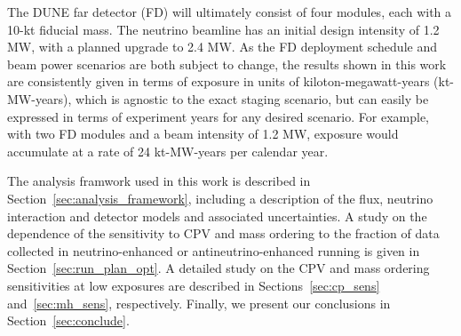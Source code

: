 The DUNE far detector (FD) will ultimately consist of four modules, each with a 10-kt fiducial mass. The neutrino beamline has an initial design intensity of 1.2 MW, with a planned upgrade to 2.4 MW. As the FD deployment schedule and beam power scenarios are both subject to change, the results shown in this work are consistently given in terms of exposure in units of kiloton-megawatt-years (kt-MW-years), which is agnostic to the exact staging scenario, but can easily be expressed in terms of experiment years for any desired scenario. For example, with two FD modules and a beam intensity of 1.2 MW, exposure would accumulate at a rate of 24 kt-MW-years per calendar year.

The analysis framwork used in this work is described in Section~\ref{sec:analysis_framework}, including a description of the flux, neutrino interaction and detector models and associated uncertainties. A study on the dependence of the sensitivity to CPV and mass ordering to the fraction of data collected in neutrino-enhanced or antineutrino-enhanced running is given in Section~\ref{sec:run_plan_opt}. A detailed study on the CPV and mass ordering sensitivities at low exposures are described in Sections~\ref{sec:cp_sens} and~\ref{sec:mh_sens}, respectively. Finally, we present our conclusions in Section~\ref{sec:conclude}.

